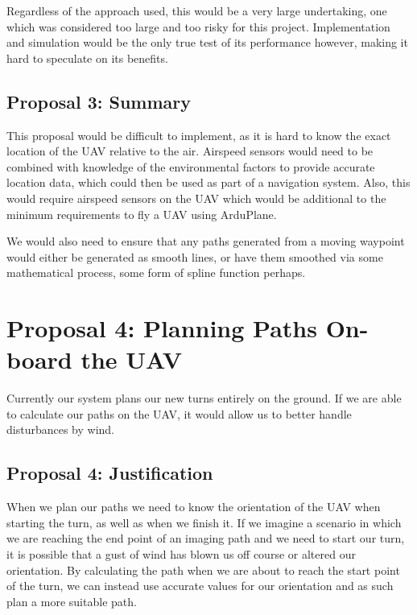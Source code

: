 Regardless of the approach used, this would be a very large undertaking, one which was considered too large and too risky for this project. Implementation and simulation would be the only true test of its performance however, making it hard to speculate on its benefits.

\subsection{Proposal 3: Summary} 
\label{future:alternatedubinssummary}

This proposal would be difficult to implement, as it is hard to know the exact location of the UAV relative to the air. Airspeed sensors would need to be combined with knowledge of the environmental factors to provide accurate location data, which could then be used as part of a navigation system. Also, this would require airspeed sensors on the UAV which would be additional to the minimum requirements to fly a UAV using ArduPlane.

We would also need to ensure that any paths generated from a moving waypoint would either be generated as smooth lines, or have them smoothed via some mathematical process, some form of spline function perhaps.

\section{Proposal 4: Planning Paths On-board the UAV} 
\label{future:onboard}

Currently our system plans our new turns entirely on the ground. If we are able to calculate our paths on the UAV, it would allow us to better handle disturbances by wind.

\subsection{Proposal 4: Justification}
\label{future:onboardreason}

When we plan our paths we need to know the orientation of the UAV when starting the turn, as well as when we finish it. If we imagine a scenario in which we are reaching the end point of an imaging path and we need to start our turn, it is possible that a gust of wind has blown us off course or altered our orientation. By calculating the path when we are about to reach the start point of the turn, we can instead use accurate values for our orientation and as such plan a more suitable path. 

